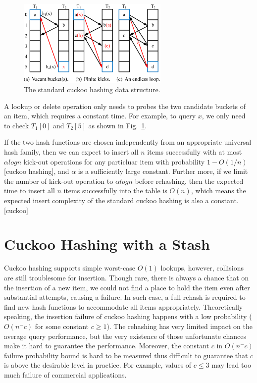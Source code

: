 \documentclass[runningheads]{llncs}
\begin{document}
\begin{figure}
    \centering
    \includegraphics[width=0.65\textwidth]{fig1.png}
    \caption{The standard cuckoo hashing data structure.
    } \label{fig:cuckoo-example}
\end{figure}

A lookup or delete operation only needs to probes the two candidate buckets of an item, which requires a constant time. For example, to query $x$, we only need to check $T_1[0]$ and $T_2[5]$ as shown in Fig.~\ref{fig:cuckoo-example}.

If the two hash functions are chosen independently from an appropriate universal hash family, then we can expect to insert all $n$ items successfully with at most $\alpha logn$ kick-out operations for any particluar item with probability $1-O(1/n)$[cuckoo hashing], and $\alpha$ is a sufficiently large constant. Further more, if we limit the number of kick-out operation to $\alpha logn$ before rehashing, then the expected time to insert all $n$ items successfully into the table is $O(n)$, which means the expected insert complexity of the standard cuckoo hashing is also a constant.[cuckoo]

\section{Cuckoo Hashing with a Stash}
\label{sec:chs}
Cuckoo hashing supports simple worst-case $O(1)$ lookups, however, collisions are still troublesome for insertion. Though rare, there is always a chance that on the insertion of a new item, we could not find a place to hold the item even after substantial attempts, causing a failure. In such case, a full rehash is required to find new hash functions to accommodate all items appropriately. Theoretically speaking, the insertion failure of cuckoo hashing happens with a low probability ($O(n^-c)$ for some constant $c\geq 1$). The rehashing has very limited impact on the average query performance, but the very existence of those unfortunate chances make it hard to guarantee the performance. Moreover, the constant $c$ in $O(n^-c)$ failure probability bound is hard to be measured thus difficult to guarantee that $c$ is above the desirable level in practice. For example, values of $c\leq3$ may lead too much failure of commercial applications.
\end{document}
